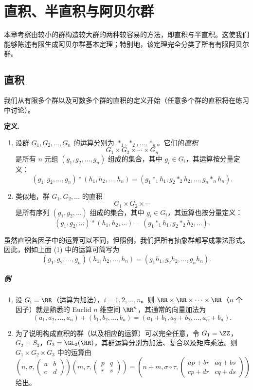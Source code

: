 \chapter{直积、半直积与阿贝尔群}

本章考察由较小的群构造较大群的两种较容易的方法，即直积与半直积。这使我们能够陈述有限生成阿贝尔群基本定理；特别地，该定理完全分类了所有有限阿贝尔群。

\section{直积}

我们从有限多个群以及可数多个群的直积的定义开始（任意多个群的直积将在练习中讨论）。

\noindent\textbf{定义.}
\begin{enumerate}[label=(\arabic*)]
  \item 设群 $G_1,G_2,\ldots,G_n$ 的运算分别为 $*_1,*_2,\ldots,*_n$。它们的\emph{直积}
  \[
    G_1\times G_2\times\cdots\times G_n
  \]
  是所有 $n$ 元组 $(g_1,g_2,\ldots,g_n)$ 组成的集合，其中 $g_i\in G_i$，其运算按分量定义：
  \[
    (g_1,g_2,\ldots,g_n)*(h_1,h_2,\ldots,h_n)
    =(g_1*_1h_1,g_2*_2h_2,\ldots,g_n*_nh_n).
  \]

  \item 类似地，群 $G_1,G_2,\ldots$ 的直积
  \[
    G_1\times G_2\times\cdots
  \]
  是所有序列 $(g_1,g_2,\ldots)$ 组成的集合，其中 $g_i\in G_i$，其运算也按分量定义：
  \[
    (g_1,g_2,\ldots)*(h_1,h_2,\ldots)=(g_1*_1h_1,g_2*_2h_2,\ldots).
  \]
\end{enumerate}

虽然直积各因子中的运算可以不同，但照例，我们把所有抽象群都写成乘法形式。因此，例如上面 (1) 中的运算可简写为
\[
  (g_1,g_2,\ldots,g_n)(h_1,h_2,\ldots,h_n)=(g_1h_1,g_2h_2,\ldots,g_nh_n).
\]

\paragraph{例}
\begin{enumerate}[label=(\arabic*)]
  \item 设 $G_i=\RR$（运算为加法），$i=1,2,\ldots,n$。则 $\RR\times\RR\times\cdots\times\RR$（$n$ 个因子）就是熟悉的 Euclid $n$ 维空间 $\RR^n$，其通常的向量加法为
  \[
    (a_1,a_2,\ldots,a_n)+(b_1,b_2,\ldots,b_n)
    =(a_1+b_1,a_2+b_2,\ldots,a_n+b_n).
  \]

  \item 为了说明构成直积的群（以及相应的运算）可以完全任意，令 $G_1=\ZZ$，$G_2=S_3$，$G_3=\GL_2(\RR)$，其群运算分别为加法、复合以及矩阵乘法。则 $G_1\times G_2\times G_3$ 中的运算由
  \[
    \left(n,\sigma,\begin{pmatrix}a&b\\ c&d\end{pmatrix}\right)
    \left(m,\tau,\begin{pmatrix}p&q\\ r&s\end{pmatrix}\right)
    =
    \left(n+m,\sigma\circ\tau,
    \begin{pmatrix}ap+br&aq+bs\\ cp+dr&cq+ds\end{pmatrix}\right)
  \]
  给出。
\end{enumerate}

